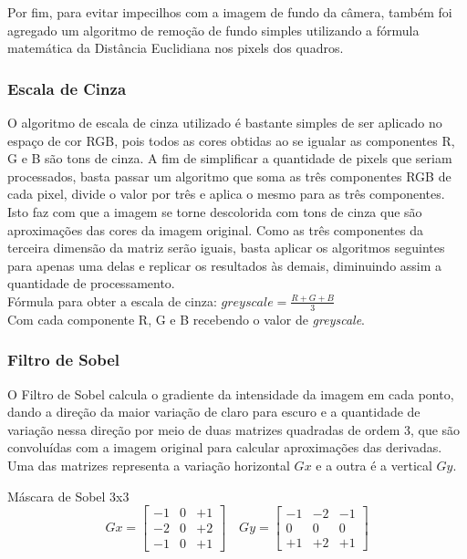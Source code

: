 \documentclass[a4paper]{article}
\begin{document}
Por fim, para evitar impecilhos com a imagem de fundo da câmera, também foi agregado um algoritmo de remoção de fundo simples utilizando a fórmula matemática da Distância Euclidiana nos pixels dos quadros. \\

\subsubsection{Escala de Cinza}

O algoritmo de escala de cinza utilizado é bastante simples de ser aplicado no espaço de cor RGB, pois todos as cores obtidas ao se igualar as componentes R, G e B são tons de cinza. A fim de simplificar a quantidade de pixels que seriam processados, basta passar um algoritmo que soma as três componentes RGB de cada pixel, divide o valor por três e aplica o mesmo para as três componentes. Isto faz com que a imagem se torne descolorida com tons de cinza que são aproximações das cores da imagem original. Como as três componentes da terceira dimensão da matriz serão iguais, basta aplicar os algoritmos seguintes para apenas uma delas e replicar os resultados às demais, diminuindo assim a quantidade de processamento. \\

Fórmula para obter a escala de cinza:
$greyscale = \frac{R + G + B}{3}$ \\

Com cada componente R, G e B recebendo o valor de \textit{greyscale}.

\subsubsection{Filtro de Sobel}

O Filtro de Sobel calcula o gradiente da intensidade da imagem em cada ponto, dando a direção da maior variação de claro para escuro e a quantidade de variação nessa direção por meio de duas matrizes quadradas de ordem 3, que são convoluídas com a imagem original para calcular aproximações das derivadas. Uma das matrizes representa a variação horizontal $Gx$ e a outra é a vertical $Gy$. \\

\begin{center}{Máscara de Sobel 3x3}
$$
Gx=\left[\begin{array}{rrr}
-1&0&+1\\
-2&0&+2 \\
-1&0&+1
\end{array}\right]\quad
Gy=\left[\begin{array}{ccc}
-1&-2&-1\\
0& 0& 0 \\
+1&+2&+1
\end{array}\right]
$$
\end{center}
\end{document}
